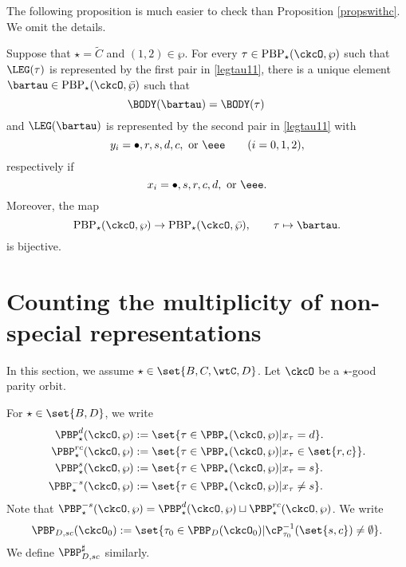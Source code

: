 \documentclass[unipcounting]{subfiles}
\begin{document}

The following proposition is much easier to check than Proposition \ref{propswithc}. We omit the details. 
\begin{prop}\label{propswithc2}
Suppose that $\star=\widetilde C$ and $(1,2)\in \wp$. For every $\tau\in \mathrm{PBP}_\star(\ckcO,\wp ) $ such that $\LEG(\tau)$ is represented by the first pair  in \eqref{legtau11}, there is a unique element $\bartau\in \mathrm{PBP}_\star(\ckcO,\bar \wp ) $ such that 
 \[
    \BODY(\bartau) = \BODY(\tau) \qquad 
\]
and $\LEG(\bartau)$ is represented by the second pair  in \eqref{legtau11} with
\[
y_i = \bullet,r,s,d,c, \text{ or }\eee\qquad (i=0,1,2),
\]
respectively if 
\[
x_i = \bullet,s,r,c,d, \text{ or }\eee.  %
\]
Moreover, the map 
\[
 \mathrm{PBP}_\star(\ckcO,\wp)\rightarrow \mathrm{PBP}_\star(\ckcO,\bar \wp), \qquad
 \tau \mapsto \bartau. 
 \]
 is bijective.
\end{prop}


\section{Counting the multiplicity of non-special representations}
In this section, we assume $\star\in \set{B,C,\wtC,D}$. 
Let $\ckcO$ be a $\star$-good parity orbit.

For $\star\in \set{B,D}$, we write 
\[
\begin{split}
\PBP_\star^d(\ckcO, \wp) & := 
\set{\tau\in \PBP_{\star}(\ckcO,\wp) | x_\tau = d}.\\
\PBP_\star^{rc}(\ckcO, \wp) & := 
\set{\tau\in \PBP_{\star}(\ckcO,\wp) | x_\tau \in \set{r,c}}.\\
\PBP_\star^{s}(\ckcO, \wp) & := 
\set{\tau\in \PBP_{\star}(\ckcO,\wp) | x_\tau = s}.\\
\PBP_\star^{-s}(\ckcO, \wp) & := 
\set{\tau\in \PBP_{\star}(\ckcO,\wp) | x_\tau \neq s}.\\
\end{split}
\]
Note that $\PBP_\star^{-s}(\ckcO, \wp)  
= \PBP_\star^d(\ckcO, \wp)\sqcup \PBP_\star^{rc}(\ckcO, \wp)$.
We write
\[
\PBP_{D,sc}(\ckcO_0) := 
\set{\tau_0\in \PBP_D(\ckcO_0)| \cP_{\tau_0}^{-1}(\set{s,c}) \neq \emptyset}. 
\]
We define $\PBP_{D,sc}^\sharp$ similarly. 
\end{document}
